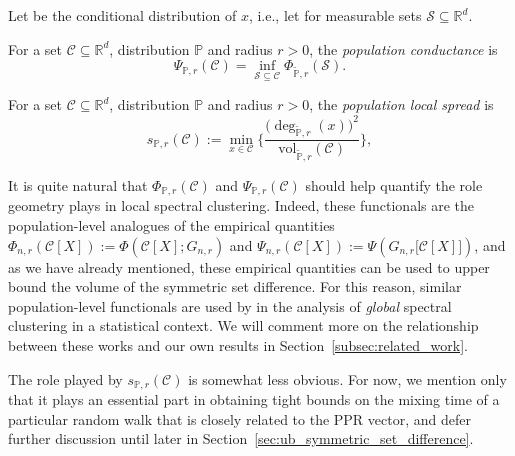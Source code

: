 \documentclass[11pt,twoside]{article}
\newcommand{\Reals}{\mathbb{R}}
\newcommand{\1}{\mathbf{1}}
\newcommand{\Rd}{\Reals^d}
\newcommand{\mc}[1]{\mathcal{#1}}
\newcommand{\Pbb}{\mathbb{P}}
\newcommand{\wt}[1]{\widetilde{#1}}
\newcommand{\vol}{\mathrm{vol}}
\begin{document}
Let \smash{$\wt{\Pbb}(\cdot) = \Pbb(\cdot|x \in \mc{C})$} be the conditional distribution of $x$, i.e., let \smash{$\wt{\Pbb}(\mc{S}) = \wt{\Pbb}(\mc{S} \cap \mc{C})/\wt{\Pbb}(\mc{C})$} for measurable sets $\mc{S} \subseteq \Rd$.

\begin{definition}
	For a set $\mc{C} \subseteq \Rd$, distribution $\Pbb$ and radius $r > 0$, the \emph{population conductance} is
	\begin{equation}
	\label{eqn:population_conductance}
	\Psi_{\Pbb,r}(\mc{C}) = \inf_{\mc{S} \subseteq \mc{C}} \Phi_{\wt{\Pbb},r}(\mc{S}).
	\end{equation}
\end{definition}

\begin{definition}
	For a set $\mc{C} \subseteq \Rd$, distribution $\Pbb$ and radius $r > 0$, the \emph{population local spread} is
	\begin{equation}
	\label{eqn:local_spread}
	s_{\Pbb,r}(\mc{C}) := \min_{x \in \mc{C}} \biggl\{\frac{\bigl(\deg_{\wt{\Pbb},r}(x)\bigr)^2}{\vol_{\wt{\Pbb},r}(\mc{C})} \biggr\},
	\end{equation}
\end{definition}

It is quite natural that $\Phi_{\Pbb,r}(\mc{C})$ and $\Psi_{\Pbb,r}(\mc{C})$ should help quantify the role geometry plays in local spectral clustering. Indeed, these functionals are the population-level analogues of the empirical quantities $\Phi_{n,r}(\mc{C}[X]) := \Phi(\mc{C}[X];G_{n,r})$ and $\Psi_{n,r}(\mc{C}[X]) := \Psi(G_{n,r}\bigl[\mc{C}[X]\bigr])$, and as we have already mentioned, these empirical quantities can be used to upper bound the volume of the symmetric set difference. For this reason, similar population-level functionals are used by \cite{shi2009,schiebinger2015,garciatrillos19} in the analysis of \emph{global} spectral clustering in a statistical context. We will comment more on the relationship between these works and our own results in Section~\ref{subsec:related_work}. 

The role played by $s_{\Pbb,r}(\mc{C})$ is somewhat less obvious. For now, we mention only that it plays an essential part in obtaining tight bounds on the mixing time of a particular random walk that is closely related to the PPR vector, and defer further discussion until later in Section~\ref{sec:ub_symmetric_set_difference}.
\end{document}
